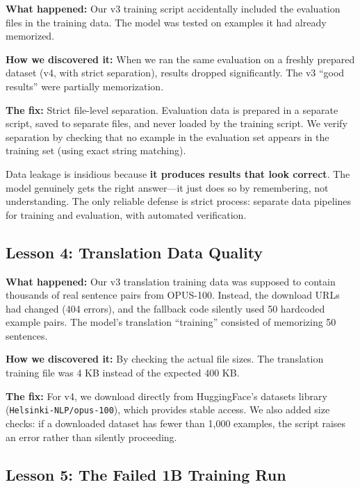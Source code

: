 \documentclass[11pt,a4paper]{article}
\begin{document}
\textbf{What happened:} Our v3 training script accidentally included the evaluation files in the training data. The model was tested on examples it had already memorized.

\textbf{How we discovered it:} When we ran the same evaluation on a freshly prepared dataset (v4, with strict separation), results dropped significantly. The v3 ``good results'' were partially memorization.

\textbf{The fix:} Strict file-level separation. Evaluation data is prepared in a separate script, saved to separate files, and never loaded by the training script. We verify separation by checking that no example in the evaluation set appears in the training set (using exact string matching).

\begin{keyidea}
Data leakage is insidious because \textbf{it produces results that look correct}. The model genuinely gets the right answer---it just does so by remembering, not understanding. The only reliable defense is strict process: separate data pipelines for training and evaluation, with automated verification.
\end{keyidea}

\subsection{Lesson 4: Translation Data Quality}

\textbf{What happened:} Our v3 translation training data was supposed to contain thousands of real sentence pairs from OPUS-100. Instead, the download URLs had changed (404 errors), and the fallback code silently used 50 hardcoded example pairs. The model's translation ``training'' consisted of memorizing 50 sentences.

\textbf{How we discovered it:} By checking the actual file sizes. The translation training file was 4 KB instead of the expected 400 KB.

\textbf{The fix:} For v4, we download directly from HuggingFace's datasets library (\texttt{Helsinki-NLP/opus-100}), which provides stable access. We also added size checks: if a downloaded dataset has fewer than 1,000 examples, the script raises an error rather than silently proceeding.

\subsection{Lesson 5: The Failed 1B Training Run}
\end{document}
